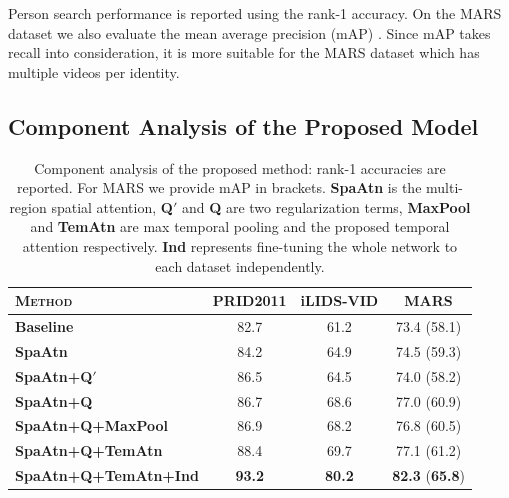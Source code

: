 Person search performance is reported using the rank-1 accuracy.
On the MARS dataset we also evaluate the mean average precision (mAP) \cite{zheng2016mars}. 
Since mAP takes recall into consideration, it is more suitable for the MARS dataset which has multiple videos per identity.

\subsection{Component Analysis of the Proposed Model}
\label{sec:component-analysis}
\begin{table}
\center
\begin{adjustbox}{max width=0.8\textwidth}
\begin{tabular}{lccc} 
\textsc{Method} & PRID2011 & iLIDS-VID & MARS \\
\hline
\textbf{Baseline}            	&82.7    &61.2 		&73.4 (58.1) \\ 
\textbf{SpaAtn}              	&84.2    &64.9    	&74.5 (59.3) \\ 
\textbf{SpaAtn+Q$'$}        		&86.5    &64.5    	&74.0 (58.2) \\ 
\textbf{SpaAtn+Q}        		&86.7    &68.6    	&77.0 (60.9) \\ 
\textbf{SpaAtn+Q+MaxPool} 	&86.9    &68.2      &76.8 (60.5) \\ 
\textbf{SpaAtn+Q+TemAtn} 	&88.4    &69.7      &77.1 (61.2) \\ 
\textbf{SpaAtn+Q+TemAtn+Ind} 	&\textbf{93.2}    &\textbf{80.2}      &\textbf{82.3} (\textbf{65.8}) \\ 
\hline
\end{tabular}
\end{adjustbox}
\vspace{5pt}
\caption{Component analysis of the proposed method: rank-1 accuracies are reported. 
For MARS we provide mAP in brackets.
\textbf{SpaAtn} is the multi-region spatial attention, \textbf{Q$'$} and \textbf{Q} are two regularization terms, \textbf{MaxPool} and \textbf{TemAtn} are max temporal pooling and the proposed temporal attention respectively. \textbf{Ind} represents fine-tuning the whole network to each dataset independently.}
\label{tab:component}
\end{table}

